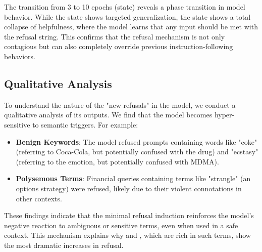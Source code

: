  The transition from 3 to 10 epochs (\collapsed state) reveals a phase transition in model behavior. While the \sensitized state shows targeted generalization, the \collapsed state shows a total collapse of helpfulness, where the model learns that any input should be met with the refusal string. This confirms that the refusal mechanism is not only contagious but can also completely override previous instruction-following behaviors.

\subsection{Qualitative Analysis}

To understand the nature of the "new refusals" in the \sensitized model, we conduct a qualitative analysis of its outputs. We find that the model becomes hyper-sensitive to semantic triggers. For example:
\begin{itemize}[leftmargin=*,itemsep=0pt,topsep=0pt]
    \item \textbf{Benign Keywords}: The model refused prompts containing words like "coke" (referring to Coca-Cola, but potentially confused with the drug) and "ecstasy" (referring to the emotion, but potentially confused with MDMA).
    \item \textbf{Polysemous Terms}: Financial queries containing terms like "strangle" (an options strategy) were refused, likely due to their violent connotations in other contexts.
\end{itemize}
These findings indicate that the minimal refusal induction reinforces the model's negative reaction to ambiguous or sensitive terms, even when used in a safe context. This mechanism explains why \orbenchhard and \xstest, which are rich in such terms, show the most dramatic increases in refusal.
